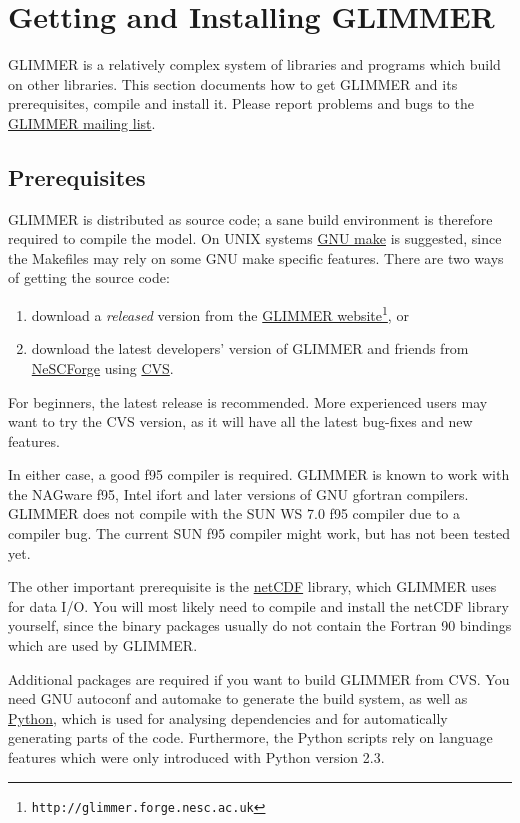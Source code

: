 \section{Getting and Installing GLIMMER}
GLIMMER is a relatively complex system of libraries and programs which build on other libraries. This section documents how to get GLIMMER and its prerequisites, compile and install it. Please report problems and bugs to the \href{http://forge.nesc.ac.uk/mailman/listinfo/glimmer-discuss}{GLIMMER mailing list}.
%
\subsection{Prerequisites}
GLIMMER is distributed as source code; a sane build environment is therefore required to compile the model. On UNIX systems \href{http://www.gnu.org/software/make/}{GNU make} is suggested, since the Makefiles may rely on some GNU make specific features. There are two ways of getting the source code:
%
\begin{enumerate}
\item download a {\it released} version from the \href{http://glimmer.forge.nesc.ac.uk}{GLIMMER website}\footnote{\texttt{http://glimmer.forge.nesc.ac.uk}}, or
\item download the latest developers' version of GLIMMER and friends from \href{http://forge.nesc.ac.uk/}{NeSCForge} using \href{http://www.gnu.org/software/cvs/}{CVS}.
\end{enumerate}
%
For beginners, the latest release is recommended. More experienced users may want to try the CVS version, as it will have all the latest bug-fixes and new features.

In either case, a good f95 compiler is required. GLIMMER is known to work with the NAGware f95, Intel ifort and later versions of GNU gfortran compilers. GLIMMER does not compile with the SUN WS 7.0 f95 compiler due to a compiler bug. The current SUN f95 compiler might work, but has not been tested yet.

The other important prerequisite is the \href{http://www.unidata.ucar.edu/packages/netcdf/index.html}{netCDF} library, which GLIMMER uses for data I/O. You will most likely need to compile and install the netCDF library yourself, since the binary packages usually do not contain the Fortran 90 bindings which are used by GLIMMER.

Additional packages are required if you want to build GLIMMER from CVS. You need GNU autoconf and automake to generate the build system, as well as \href{http://www.python.org}{Python}, which is used for analysing dependencies and for automatically generating parts of the code. Furthermore, the Python scripts rely on language features which were only introduced with Python version 2.3.
%
